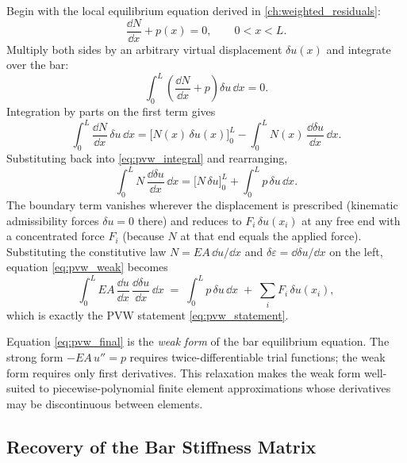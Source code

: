 Begin with the local equilibrium equation derived in
\cref{ch:weighted_residuals}:
\begin{equation}
    \frac{\dd N}{\dd x} + p(x) = 0, \qquad 0 < x < L .
    \label{eq:pvw_equilibrium}
\end{equation}
Multiply both sides by an arbitrary virtual displacement $\delta u(x)$ and
integrate over the bar:
\begin{equation}
    \int_0^L \left( \frac{\dd N}{\dd x} + p \right) \delta u\,\dd x = 0 .
    \label{eq:pvw_integral}
\end{equation}
Integration by parts on the first term gives
\begin{equation}
    \int_0^L \frac{\dd N}{\dd x}\,\delta u\,\dd x
    = \big[N(x)\,\delta u(x)\big]_0^L
    - \int_0^L N(x)\,\frac{\dd \delta u}{\dd x}\,\dd x .
    \label{eq:pvw_ibp}
\end{equation}
Substituting back into \cref{eq:pvw_integral} and rearranging,
\begin{equation}
    \int_0^L N\,\frac{\dd \delta u}{\dd x}\,\dd x
    = \big[N\,\delta u\big]_0^L + \int_0^L p\,\delta u\,\dd x .
    \label{eq:pvw_weak}
\end{equation}
The boundary term vanishes wherever the displacement is prescribed (kinematic
admissibility forces $\delta u = 0$ there) and reduces to $F_i\,\delta u(x_i)$
at any free end with a concentrated force $F_i$ (because $N$ at that end
equals the applied force). Substituting the constitutive law
$N = EA\,\dd u/\dd x$ and $\delta\varepsilon = \dd \delta u/\dd x$ on the
left, equation \cref{eq:pvw_weak} becomes
\begin{equation}
    \int_0^L EA\,\frac{\dd u}{\dd x}\,\frac{\dd \delta u}{\dd x}\,\dd x
    \;=\;
    \int_0^L p\,\delta u\,\dd x \;+\; \sum_i F_i\,\delta u(x_i) ,
    \label{eq:pvw_final}
\end{equation}
which is exactly the PVW statement \cref{eq:pvw_statement}.

\begin{remark}
Equation \cref{eq:pvw_final} is the \emph{weak form} of the bar equilibrium
equation. The strong form $-EA\,u'' = p$ requires twice-differentiable trial
functions; the weak form requires only first derivatives. This relaxation
makes the weak form well-suited to piecewise-polynomial finite element
approximations whose derivatives may be discontinuous between elements.
\end{remark}

\subsection{Recovery of the Bar Stiffness Matrix}

